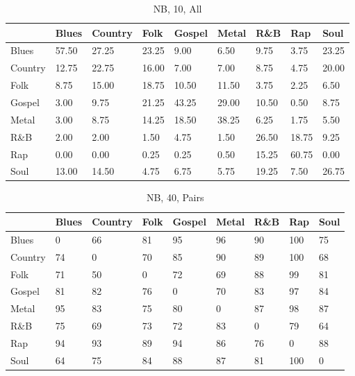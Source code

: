 \documentclass[a4paper,oneside]{article}
\begin{document}
\begin{table}[H]
\caption{NB, 10, All}
\begin{tabu}{l|*{8}{l}}
&	Blues & Country & Folk & Gospel & Metal & R\&B & Rap & Soul \\ \hline
Blues & 57.50 & 27.25 & 23.25 & 9.00 & 6.50 & 9.75 & 3.75 & 23.25 \\
Country & 12.75 & 22.75 & 16.00 & 7.00 & 7.00 & 8.75 & 4.75 & 20.00 \\
Folk & 8.75 & 15.00 & 18.75 & 10.50 & 11.50 & 3.75 & 2.25 & 6.50 \\
Gospel & 3.00 & 9.75 & 21.25 & 43.25 & 29.00 & 10.50 & 0.50 & 8.75 \\
Metal & 3.00 & 8.75 & 14.25 & 18.50 & 38.25 & 6.25 & 1.75 & 5.50 \\
R\&B & 2.00 & 2.00 & 1.50 & 4.75 & 1.50 & 26.50 & 18.75 & 9.25 \\
Rap & 0.00 & 0.00 & 0.25 & 0.25 & 0.50 & 15.25 & 60.75 & 0.00 \\
Soul & 13.00 & 14.50 & 4.75 & 6.75 & 5.75 & 19.25 & 7.50 & 26.75 \\
\end{tabu}
\end{table}

\begin{table}[H]
\caption{NB, 40, Pairs}
\begin{tabu}{l|*{8}{l}}
 & Blues & Country & Folk & Gospel & Metal & R\&B & Rap & Soul \\ \hline
Blues & 0 & 66 & 81 & 95 & 96 & 90 & 100 & 75 \\
Country & 74 & 0 & 70 & 85 & 90 & 89 & 100 & 68 \\
Folk & 71 & 50 & 0 & 72 & 69 & 88 & 99 & 81 \\
Gospel & 81 & 82 & 76 & 0 & 70 & 83 & 97 & 84 \\
Metal & 95 & 83 & 75 & 80 & 0 & 87 & 98 & 87 \\
R\&B & 75 & 69 & 73 & 72 & 83 & 0 & 79 & 64 \\
Rap & 94 & 93 & 89 & 94 & 86 & 76 & 0 & 88 \\
Soul & 64 & 75 & 84 & 88 & 87 & 81 & 100 & 0 \\
\end{tabu}
\end{table}
\end{document}
